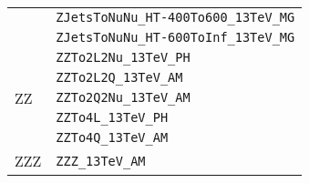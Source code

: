\begin{longtable}{ll}
 & \texttt{ZJetsToNuNu\_HT-400To600\_13TeV\_MG} \\
 & \texttt{ZJetsToNuNu\_HT-600ToInf\_13TeV\_MG} \\
\midrule
\multirow{5}{*}{ZZ} & \texttt{ZZTo2L2Nu\_13TeV\_PH} \\
 & \texttt{ZZTo2L2Q\_13TeV\_AM} \\
 & \texttt{ZZTo2Q2Nu\_13TeV\_AM} \\
 & \texttt{ZZTo4L\_13TeV\_PH} \\
 & \texttt{ZZTo4Q\_13TeV\_AM} \\
\midrule
\multirow{1}{*}{ZZZ} & \texttt{ZZZ\_13TeV\_AM} \\
\bottomrule
\end{longtable}
